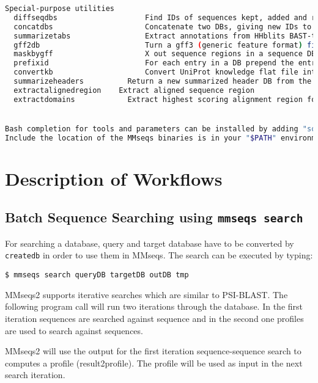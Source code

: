\documentclass[11pt,a4paper]{scrreprt}
\begin{document}
\begin{lstlisting}[language=bash, basicstyle=\footnotesize]
Special-purpose utilities
  diffseqdbs                    Find IDs of sequences kept, added and removed between two versions of sequence DB
  concatdbs                     Concatenate two DBs, giving new IDs to entries from second input DB
  summarizetabs                 Extract annotations from HHblits BAST-tab-formatted results
  gff2db                        Turn a gff3 (generic feature format) file into a gff3 DB
  maskbygff                     X out sequence regions in a sequence DB by features in a gff3 file
  prefixid                      For each entry in a DB prepend the entry ID to the entry itself
  convertkb                     Convert UniProt knowledge flat file into knowledge DB for the selected column types
  summarizeheaders          Return a new summarized header DB from the UniProt headers of a cluster DB
  extractalignedregion    Extract aligned sequence region
  extractdomains            Extract highest scoring alignment region for each sequence from BLAST-tab file


Bash completion for tools and parameters can be installed by adding "source path/to/mmseqs/util/bash-completion.sh" to your "$HOME/.bash_profile".
Include the location of the MMseqs binaries is in your "$PATH" environment variable.
\end{lstlisting}
\section{Description of Workflows}
\subsection{Batch Sequence Searching using \texttt{mmseqs search}}


For searching a database, query and target database have to be converted by \texttt{createdb} in order to use them in MMseqs. The search can be executed by typing:


\begin{verbatim}
$ mmseqs search queryDB targetDB outDB tmp
\end{verbatim}


MMseqs2 supports iterative searches which are similar to PSI-BLAST.   The following program call will run two iterations through the database. In the first iteration sequences  are searched against sequence and in the second one profiles are used to search against sequences.


MMseqs2 will use the output for the first iteration sequence-sequence search to computes a profile (result2profile). The profile will be used as input in the next search iteration. 
\end{document}
